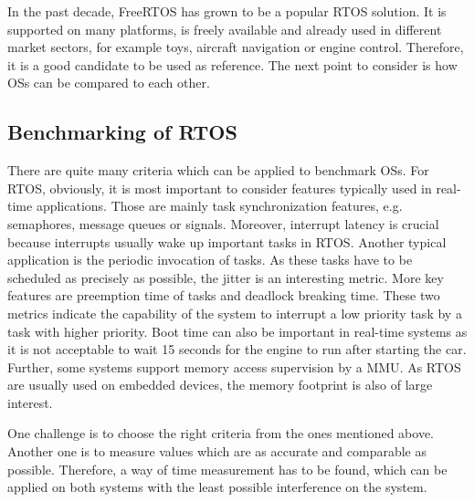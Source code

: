 In the past decade, FreeRTOS has grown to be a popular \ac{RTOS} solution.
It is supported on many platforms, is freely available and already used in different market sectors, for example toys, aircraft navigation or engine control. 
Therefore, it is a good candidate to be used as reference.  
The next point to consider is how \acp{OS} can be compared to each other.
 
\subsection{Benchmarking of RTOS}
There are quite many criteria which can be applied to benchmark \acp{OS}.
For \ac{RTOS}, obviously, it is most important to consider features typically used in real-time applications.
Those are mainly task synchronization features, e.g. semaphores, message queues or signals.
Moreover, interrupt latency is crucial because interrupts usually wake up important tasks in \ac{RTOS}.
Another typical application is the periodic invocation of tasks. 
As these tasks have to be scheduled as precisely as possible, the jitter is an interesting metric.
More key features are preemption time of tasks and deadlock breaking time.
These two metrics indicate the capability of the system to interrupt a low priority task by a task with higher priority. 
Boot time can also be important in real-time systems as it is not acceptable to wait 15 seconds for the engine to run after starting the car.
Further, some systems support memory access supervision by a \ac{MMU}.
As \ac{RTOS} are usually used on embedded devices, the memory footprint is also of large interest. 
\par
One challenge is to choose the right criteria from the ones mentioned above. 
Another one is to measure values which are as accurate and comparable as possible.
Therefore, a way of time measurement has to be found, which can be applied on both systems with the least possible interference on the system.

